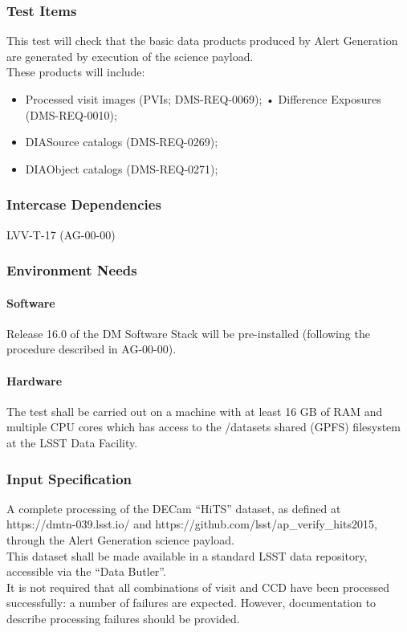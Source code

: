 \subsubsection{Test Items}
This test will check that the basic data products produced by Alert
Generation are generated by execution of the science payload.\\
These products will include:

\begin{itemize}
\tightlist
\item
  Processed visit images (PVIs; DMS-REQ-0069); • Difference Exposures
  (DMS-REQ-0010);
\item
  DIASource catalogs (DMS-REQ-0269);
\item
  DIAObject catalogs (DMS-REQ-0271);
\end{itemize}



\subsubsection{Intercase Dependencies}
LVV-T-17 (AG-00-00)


\subsubsection{Environment Needs}

\paragraph{Software}
Release 16.0 of the DM Software Stack will be pre-installed (following
the procedure described in AG-00-00).


\paragraph{Hardware}
The test shall be carried out on a machine with at least 16 GB of RAM
and multiple CPU cores which has access to the /datasets shared (GPFS)
filesystem at the LSST Data Facility.


\subsubsection{Input Specification}
A complete processing of the DECam ``HiTS'' dataset, as defined at
https://dmtn-039.lsst.io/ and
https://github.com/lsst/ap\_verify\_hits2015, through the Alert
Generation science payload.\\
This dataset shall be made available in a standard LSST data repository,
accessible via the ``Data Butler''.\\
It is not required that all combinations of visit and CCD have been
processed successfully: a number of failures are expected. However,
documentation to describe processing failures should be provided.


